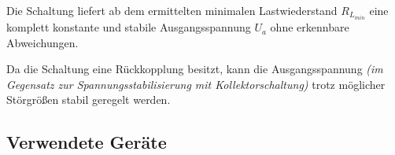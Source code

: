 \documentclass[a4paper]{hitec}
\begin{document}
Die Schaltung liefert ab dem ermittelten minimalen Lastwiederstand $R_{L_{min}}$ eine komplett konstante und stabile Ausgangsspannung $U_{a}$ ohne erkennbare Abweichungen.

Da die Schaltung eine Rückkopplung besitzt, kann die Ausgangsspannung \textit{(im Gegensatz zur Spannungsstabilisierung mit Kollektorschaltung)} trotz möglicher Störgrößen stabil geregelt werden.

\subsection{Verwendete Geräte}

\begin{devicelist}
\end{devicelist}

\clearpage

\IncludeHistoryTimeline

\clearpage




\end{document}

